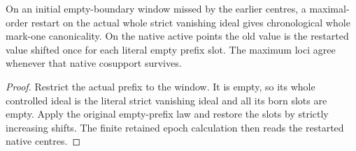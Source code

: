 \begin{theorem}
\label{hir:g8-restarted-empty-native-epoch}
\leanok
On an initial empty-boundary window missed by the earlier
centres, a maximal-order restart on the actual whole strict
vanishing ideal gives chronological whole mark-one
canonicality. On the native active points the old value
is the restarted value shifted once for each literal empty
prefix slot. The maximum loci agree whenever that native
cosupport survives.
\end{theorem}
\begin{proof}
Restrict the actual prefix to the window. It is empty, so
its whole controlled ideal is the literal strict vanishing
ideal and all its born slots are empty. Apply the original
empty-prefix law and restore the slots by strictly increasing
shifts. The finite retained epoch calculation then reads
the restarted native centres.
\end{proof}

